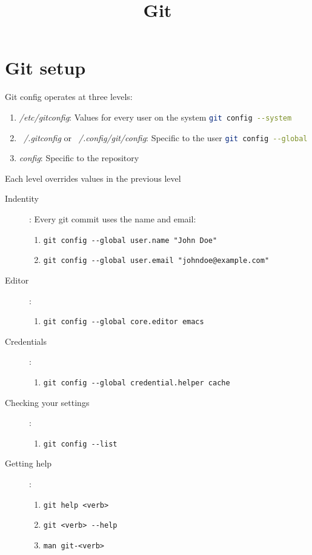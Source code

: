 \documentclass[french]{article}
\title{Git}
\begin{document}
\date{}

\maketitle

\setlength{\parindent}{0cm}

\section{Git setup}

Git config operates at three levels:
\begin{enumerate}
    \item \emph{/etc/gitconfig}: Values for every user on the system \lstinline[language=bash]{git config --system}
    \item \emph{~/.gitconfig} or \emph{~/.config/git/config}: Specific to the user \lstinline[language=bash]{git config --global}
    \item \emph{config}: Specific to the repository
\end{enumerate}
Each level overrides values in the previous level

\begin{description}
    \item[Indentity]: Every git commit uses the name and email:
        \begin{enumerate}
            \item[-] \lstinline{git config --global user.name "John Doe"}
            \item[-] \lstinline{git config --global user.email "johndoe@example.com"}
        \end{enumerate}
    \item[Editor]:
        \begin{enumerate}
            \item[-] \lstinline{git config --global core.editor emacs}
        \end{enumerate}
    \item[Credentials]:
        \begin{enumerate}
            \item[-] \lstinline{git config --global credential.helper cache}
        \end{enumerate}
    \item[Checking your settings]:
        \begin{enumerate}
            \item[-] \lstinline{git config --list}
        \end{enumerate}
    \item[Getting help]:
        \begin{enumerate}
            \item[-] \lstinline{git help <verb>}
            \item[-] \lstinline{git <verb> --help}
            \item[-] \lstinline{man git-<verb>}
        \end{enumerate}
\end{description}
\end{document}
